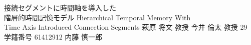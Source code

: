 \documentclass[final,a4j,12pt]{jreport}
\begin{document}
\begin{titlepage}
\thesis
{接続セグメントに時間軸を導入した \\ 階層的時間記憶モデル}
{Hierarchical Temporal Memory With \\ Time Axis Introduced Connection Segments}
{萩原 将文 教授}
{今井 倫太 教授}
{29}
{学籍番号 61412912}
{内藤 慎一郎}
\end{titlepage}

\contents










\printbibliography[title=参考文献]

\appendix


% 
% 
\end{document}
